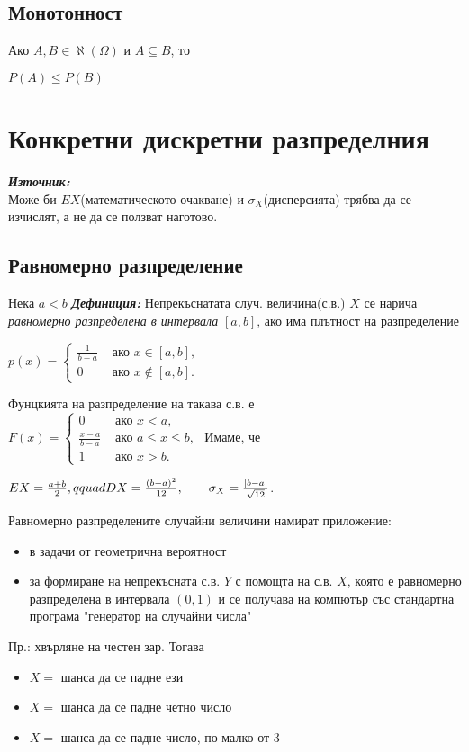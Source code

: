 \documentclass[11pt]{article} %
\newcommand{\italicBold}[1]{\textbf{\emph{#1}}}
\newcommand{\definition}{\italicBold{Дефиниция: }}
\newcommand{\source}{\italicBold{Източник: }}
\begin{document}
\subsection{Монотонност}
Ако $A,B \in \aleph(\Omega)$ и $A \subseteq B$, то\\
\centerline{$P(A) \leq P(B)$}

\section{Конкретни дискретни разпределния}
\source {}\\

Може би $EX$(математическото очакване) и $\sigma_{X}$(дисперсията) трябва да се изчислят, а не да се ползват наготово.

\subsection{Равномерно разпределение}
Нека $a<b$
\definition Непрекъснатата случ. величина(с.в.) $X$ се нарича \textit{равномерно разпределена в интервала} $[a,b]$, ако има плътност на разпределение \\
\centerline{$p(x)=
\begin{cases} 
      \frac{1}{b-a} & \text{ ако } x \in [a,b],\\
      0 & \text{ ако } x \not\in [a,b].
\end{cases}$}
Фунцкията на разпределение на такава с.в. е \\
$F(x) = 
\begin{cases} 
      0 & \text{ ако } x < a,\\
      \frac{x-a}{b-a} & \text{ ако } a \leq x \leq b,\\
      1 & \text{ ако } x > b.
\end{cases}$
Имаме, че\\
\centerline{$EX = \frac{a+b}{2}, \\qquad DX=\frac{(b-a)^{2}}{12}, \qquad \sigma_{X}=\frac{|b-a|}{\sqrt{12}}$.}
Равномерно разпределените случайни величини намират приложение: 
\begin{itemize}
	\item в задачи от геометрична вероятност\\
	\item за формиране на непрекъсната с.в. $Y$ с помощта на с.в. $X$, която е равномерно разпределена в интервала $(0,1)$ и се получава на компютър със стандартна програма "генератор на случайни числа"\\
\end{itemize}
Пр.: хвърляне на честен зар. Тогава
\begin{itemize}
	\item $X=$ шанса да се падне ези\\
	\item $X=$ шанса да се падне четно число\\
	\item $X=$ шанса да се падне число, по малко от 3\\
\end{itemize}
\end{document}
